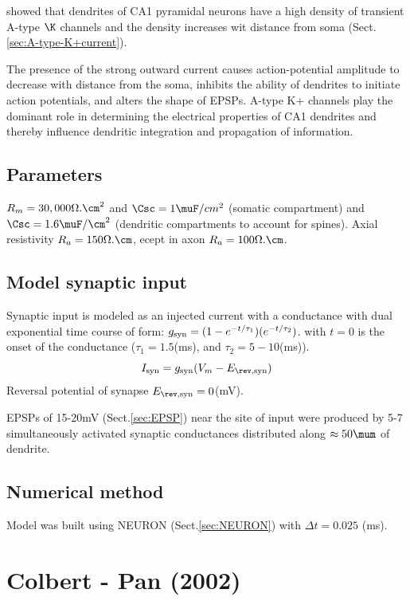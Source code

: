 \citep{hoffman1997} showed that dendrites of CA1 pyramidal neurons  have a high
density of transient A-type $\K$ channels and the density increases wit distance
from soma (Sect.\ref{sec:A-type-K+current}).

The presence of the strong outward current causes action-potential amplitude to
decrease with distance from the soma, inhibits the ability of dendrites to
initiate action potentials, and alters the shape of EPSPs.
A-type K+ channels play the dominant role in determining the electrical
properties of CA1 dendrites and thereby influence dendritic integration and
propagation of information.

\subsection{Parameters}

$R_m = 30,000 \Omega.\cm^2$ and $\Csc = 1\muF/cm^2$ (somatic compartment) and
$\Csc = 1.6\muF/\cm^2$ (dendritic compartments to account for spines).
Axial resistivity $R_a = 150 \Omega.\cm$, ecept in axon $R_a = 100 \Omega.\cm$.

\subsection{Model synaptic input}
\label{sec:EPSP-model-synaptic-input-Hoffman1997}

Synaptic input is modeled as an injected current with a conductance with dual
exponential time course of form: $g_{\text{syn}} = (1-e^{-t/\tau_1})(e^{-t/\tau_2})$.
with $t=0$ is the onset of the conductance ($\tau_1 = 1.5$(ms), and 
$\tau_2 = 5-10$(ms)).
\begin{equation}
I_\syn = g_\syn (V_m - E_{\rev,\syn})
\end{equation}
Reversal potential of synapse $E_{\rev,\syn}=0$(mV).

EPSPs of 15-20mV (Sect.\ref{sec:EPSP}) near the site of input were produced by
5-7 simultaneously activated synaptic conductances distributed along $\approx
50\mum$ of dendrite.


\subsection{Numerical method}

Model was built using NEURON (Sect.\ref{sec:NEURON}) with $\Delta t = 0.025$
(ms).


\section{Colbert - Pan (2002)}
\label{sec:Colbert-Pan-2002}

